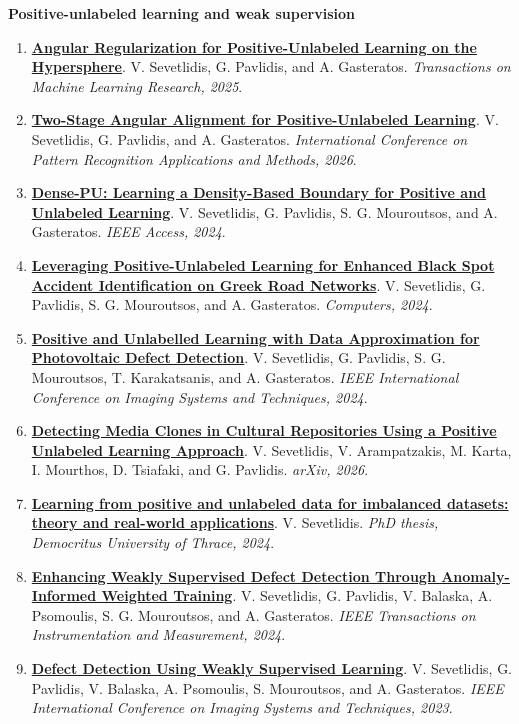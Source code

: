 \documentclass[11pt,a4paper]{article}
\newcommand{\paper}[4]{%
  \item \textbf{\href{#4}{#1}}. #2. \textit{#3}.
}
\begin{document}
\textbf{Positive-unlabeled learning and weak supervision}
\begin{enumerate}
  \paper{Angular Regularization for Positive-Unlabeled Learning on the Hypersphere}{V. Sevetlidis, G. Pavlidis, and A. Gasteratos}{Transactions on Machine Learning Research, 2025}{https://openreview.net/forum?id=XQhO0Ly6el}
  \paper{Two-Stage Angular Alignment for Positive-Unlabeled Learning}{V. Sevetlidis, G. Pavlidis, and A. Gasteratos}{International Conference on Pattern Recognition Applications and Methods, 2026}{https://www.scitepress.org/Papers/2026/139641/139641.pdf}
  \paper{Dense-PU: Learning a Density-Based Boundary for Positive and Unlabeled Learning}{V. Sevetlidis, G. Pavlidis, S. G. Mouroutsos, and A. Gasteratos}{IEEE Access, 2024}{https://doi.org/10.1109/ACCESS.2024.3420453}
  \paper{Leveraging Positive-Unlabeled Learning for Enhanced Black Spot Accident Identification on Greek Road Networks}{V. Sevetlidis, G. Pavlidis, S. G. Mouroutsos, and A. Gasteratos}{Computers, 2024}{https://doi.org/10.3390/computers13020049}
  \paper{Positive and Unlabelled Learning with Data Approximation for Photovoltaic Defect Detection}{V. Sevetlidis, G. Pavlidis, S. G. Mouroutsos, T. Karakatsanis, and A. Gasteratos}{IEEE International Conference on Imaging Systems and Techniques, 2024}{https://doi.org/10.1109/IST63414.2024.10759214}
  \paper{Detecting Media Clones in Cultural Repositories Using a Positive Unlabeled Learning Approach}{V. Sevetlidis, V. Arampatzakis, M. Karta, I. Mourthos, D. Tsiafaki, and G. Pavlidis}{arXiv, 2026}{https://arxiv.org/abs/2604.04071}
  \paper{Learning from positive and unlabeled data for imbalanced datasets: theory and real-world applications}{V. Sevetlidis}{PhD thesis, Democritus University of Thrace, 2024}{https://repo.lib.duth.gr/jspui/handle/123456789/19964}
  \paper{Enhancing Weakly Supervised Defect Detection Through Anomaly-Informed Weighted Training}{V. Sevetlidis, G. Pavlidis, V. Balaska, A. Psomoulis, S. G. Mouroutsos, and A. Gasteratos}{IEEE Transactions on Instrumentation and Measurement, 2024}{https://ieeexplore.ieee.org/document/10716729/}
  \paper{Defect Detection Using Weakly Supervised Learning}{V. Sevetlidis, G. Pavlidis, V. Balaska, A. Psomoulis, S. Mouroutsos, and A. Gasteratos}{IEEE International Conference on Imaging Systems and Techniques, 2023}{https://arxiv.org/abs/2303.15092}
\end{enumerate}
\end{document}
